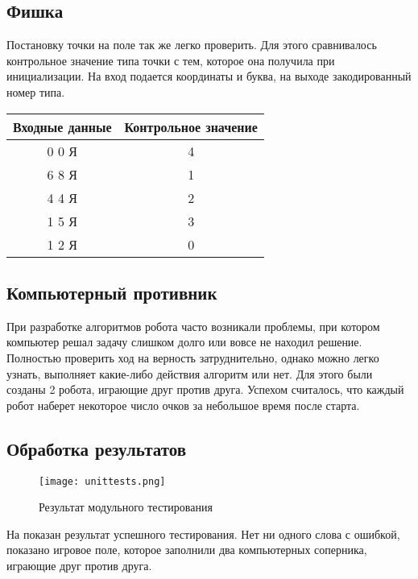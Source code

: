 \documentclass[a4paper,14pt]{article}
\begin{document}
	\subsection{Фишка}
	Постановку точки на поле так же легко проверить.
	Для этого сравнивалось контрольное значение типа точки с тем, которое она получила при инициализации.
	На вход подается координаты и буква, на выходе закодированный номер типа.
	
	\begin{table}[!h]
		\begin{center}
			\begin{tabular}{|c|c|}
				\hline
				Входные данные          & Контрольное значение \\ \hline
				0 0 Я& 4 \\ \hline
				6 8 Я& 1 \\ \hline
				4 4 Я& 2 \\ \hline
				1 5 Я& 3 \\ \hline
				1 2 Я& 0 \\ \hline
			\end{tabular}
		\end{center}
	\end{table}

	\subsection{Компьютерный противник}
	При разработке алгоритмов робота часто возникали проблемы, при котором компьютер решал задачу слишком долго или вовсе не находил решение.
	Полностью проверить ход на верность затруднительно, однако можно легко узнать, выполняет какие-либо действия алгоритм или нет.
	Для этого были созданы 2 робота, играющие друг против друга.
	Успехом считалось, что каждый робот наберет некоторое число очков за небольшое время после старта.
	
	\subsection{Обработка результатов}
	\begin{figure}[bhtp]
		\centering		
		\texttt{[image: unittests.png]}
		\caption{Результат модульного тестирования}\label{img:tests}
	\end{figure}
	
	На  показан результат успешного тестирования.
	Нет ни одного слова с ошибкой, показано игровое поле, которое заполнили два компьютерных соперника, играющие друг против друга.
	
\end{document}
